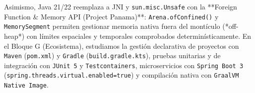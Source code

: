 \documentclass{book}
\begin{document}
Asimismo, Java 21/22 reemplaza a JNI y \texttt{sun.misc.Unsafe} con la **Foreign Function \& Memory API (Project Panama)**: \texttt{Arena.ofConfined()} y \texttt{MemorySegment} permiten gestionar memoria nativa fuera del montículo (*off-heap*) con límites espaciales y temporales comprobados determinísticamente. En el Bloque G (Ecosistema), estudiamos la gestión declarativa de proyectos con \texttt{Maven} (\texttt{pom.xml}) y \texttt{Gradle} (\texttt{build.gradle.kts}), pruebas unitarias y de integración con \texttt{JUnit 5} y \texttt{Testcontainers}, microservicios con \texttt{Spring Boot 3} (\texttt{spring.threads.virtual.enabled=true}) y compilación nativa con \texttt{GraalVM Native Image}.
\end{document}
